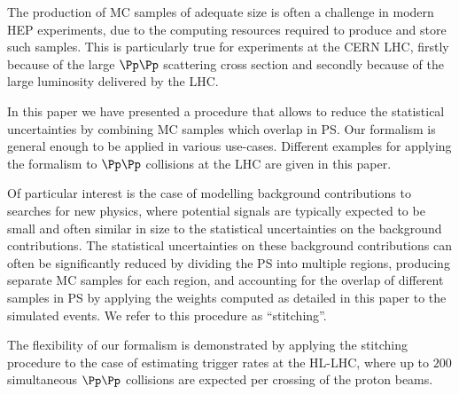 \documentclass[twocolumn,epjc3]{svjour3}
\begin{document}
The production of MC samples of adequate size is often a challenge in modern HEP experiments,
due to the computing resources required to produce and store such samples.
This is particularly true for experiments at the CERN LHC,
firstly because of the large $\Pp\Pp$ scattering cross section and secondly because of the large luminosity delivered by the LHC.

In this paper we have presented a procedure that allows to reduce the statistical uncertainties 
by combining MC samples which overlap in PS.
Our formalism is general enough to be applied in various use-cases.
Different examples for applying the formalism to $\Pp\Pp$ collisions at the LHC are given in this paper.

Of particular interest is the case of modelling background contributions to searches for new physics,
where potential signals are typically expected to be small and often similar in size to the statistical uncertainties on the background contributions.
The statistical uncertainties on these background contributions can often be significantly reduced 
by dividing the PS into multiple regions, producing separate MC samples for each region,
and accounting for the overlap of different samples in PS by applying the weights computed as detailed in this paper to the simulated events.
We refer to this procedure as ``stitching''.

The flexibility of our formalism is demonstrated by applying the stitching procedure to the case of estimating trigger rates at the HL-LHC,
where up to $200$ simultaneous $\Pp\Pp$ collisions are expected per crossing of the proton beams.


\end{document}
